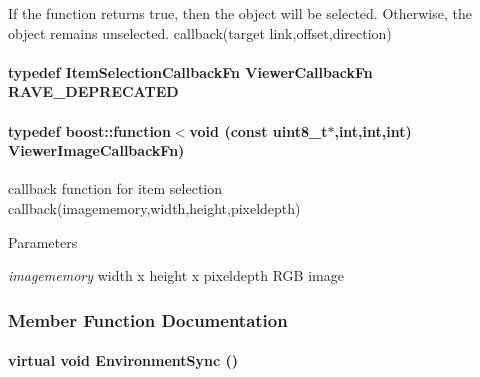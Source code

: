 If the function returns true, then the object will be selected. Otherwise, the object remains unselected. callback(target link,offset,direction) \hypertarget{classOpenRAVE_1_1ViewerBase_ab0582044ee7b7222de5e7406ad64f93a}{
\paragraph[{RAVE\_\-DEPRECATED}]{\setlength{\rightskip}{0pt plus 5cm}typedef {\bf ItemSelectionCallbackFn} ViewerCallbackFn {\bf RAVE\_\-DEPRECATED}}\hfill}
\label{classOpenRAVE_1_1ViewerBase_ab0582044ee7b7222de5e7406ad64f93a}
\hypertarget{classOpenRAVE_1_1ViewerBase_a33dae9848e343e6740ad259e09e92607}{
\paragraph[{ViewerImageCallbackFn}]{\setlength{\rightskip}{0pt plus 5cm}typedef boost::function$<$void (const uint8\_\-t$\ast$,int,int,int) {\bf ViewerImageCallbackFn})}\hfill}
\label{classOpenRAVE_1_1ViewerBase_a33dae9848e343e6740ad259e09e92607}


callback function for item selection callback(imagememory,width,height,pixeldepth) 


\begin{DoxyParams}{Parameters}
\item[{\em imagememory}]width x height x pixeldepth RGB image \end{DoxyParams}


\subsubsection{Member Function Documentation}
\hypertarget{classOpenRAVE_1_1ViewerBase_a252e5291c15eb4d6956ee5c824a4c56d}{
\paragraph[{EnvironmentSync}]{\setlength{\rightskip}{0pt plus 5cm}virtual void EnvironmentSync ()}\hfill}
\label{classOpenRAVE_1_1ViewerBase_a252e5291c15eb4d6956ee5c824a4c56d}


